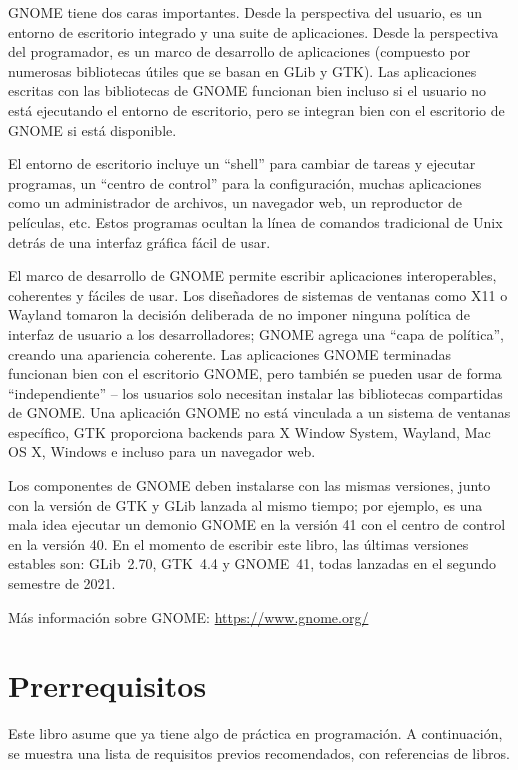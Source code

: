 GNOME tiene dos caras importantes. Desde la perspectiva del usuario, es un entorno de escritorio integrado y una suite de aplicaciones. Desde la perspectiva del programador, es un marco de desarrollo de aplicaciones (compuesto por numerosas bibliotecas útiles que se basan en GLib y GTK). Las aplicaciones escritas con las bibliotecas de GNOME funcionan bien incluso si el usuario no está ejecutando el entorno de escritorio, pero se integran bien con el escritorio de GNOME si está disponible.

El entorno de escritorio incluye un ``shell'' para cambiar de tareas y ejecutar programas, un ``centro de control'' para la configuración, muchas aplicaciones como un administrador de archivos, un navegador web, un reproductor de películas, etc. Estos programas ocultan la línea de comandos tradicional de Unix detrás de una interfaz gráfica fácil de usar.

El marco de desarrollo de GNOME permite escribir aplicaciones interoperables, coherentes y fáciles de usar. Los diseñadores de sistemas de ventanas como X11 o Wayland tomaron la decisión deliberada de no imponer ninguna política de interfaz de usuario a los desarrolladores; GNOME agrega una ``capa de política'', creando una apariencia coherente. Las aplicaciones GNOME terminadas funcionan bien con el escritorio GNOME, pero también se pueden usar de forma ``independiente'' -- los usuarios solo necesitan instalar las bibliotecas compartidas de GNOME. Una aplicación GNOME no está vinculada a un sistema de ventanas específico, GTK proporciona backends para X Window System, Wayland, Mac OS X, Windows e incluso para un navegador web.

Los componentes de GNOME deben instalarse con las mismas versiones, junto con la versión de GTK y GLib lanzada al mismo tiempo; por ejemplo, es una mala idea ejecutar un demonio GNOME en la versión 41 con el centro de control en la versión 40. En el momento de escribir este libro, las últimas versiones estables son: GLib~2.70, GTK~4.4 y GNOME~41, todas lanzadas en el segundo semestre de 2021. 

Más información sobre GNOME: \url{https://www.gnome.org/}

\section{Prerrequisitos}

Este libro asume que ya tiene algo de práctica en programación. A continuación, se muestra una lista de requisitos previos recomendados, con referencias de libros.

